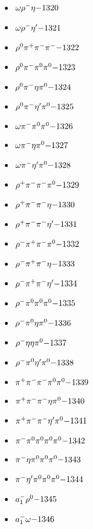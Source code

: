 \begin{multicols}{3}
\begin{itemize}
 \item $ \omega \rho^{-} \eta \hfill{-1320}$
 \item $ \omega \rho^{-} {\eta^{\prime}} \hfill{-1321}$
 \item $ \rho^{0} \pi^{+} \pi^{-} \pi^{-} \hfill{-1322}$
 \item $ \rho^{0} \pi^{-} \pi^{0} \pi^{0} \hfill{-1323}$
 \item $ \rho^{0} \pi^{-} \eta \pi^{0} \hfill{-1324}$
 \item $ \rho^{0} \pi^{-} {\eta^{\prime}} \pi^{0} \hfill{-1325}$
 \item $ \omega \pi^{-} \pi^{0} \pi^{0} \hfill{-1326}$
 \item $ \omega \pi^{-} \eta \pi^{0} \hfill{-1327}$
 \item $ \omega \pi^{-} {\eta^{\prime}} \pi^{0} \hfill{-1328}$
 \item $ \rho^{+} \pi^{-} \pi^{-} \pi^{0} \hfill{-1329}$
 \item $ \rho^{+} \pi^{-} \pi^{-} \eta \hfill{-1330}$
 \item $ \rho^{+} \pi^{-} \pi^{-} {\eta^{\prime}} \hfill{-1331}$
 \item $ \rho^{-} \pi^{+} \pi^{-} \pi^{0} \hfill{-1332}$
 \item $ \rho^{-} \pi^{+} \pi^{-} \eta \hfill{-1333}$
 \item $ \rho^{-} \pi^{+} \pi^{-} {\eta^{\prime}} \hfill{-1334}$
 \item $ \rho^{-} \pi^{0} \pi^{0} \pi^{0} \hfill{-1335}$
 \item $ \rho^{-} \pi^{0} \eta \pi^{0} \hfill{-1336}$
 \item $ \rho^{-} \eta \eta \pi^{0} \hfill{-1337}$
 \item $ \rho^{-} \pi^{0} {\eta^{\prime}} \pi^{0} \hfill{-1338}$
 \item $ \pi^{+} \pi^{-} \pi^{-} \pi^{0} \pi^{0} \hfill{-1339}$
 \item $ \pi^{+} \pi^{-} \pi^{-} \eta \pi^{0} \hfill{-1340}$
 \item $ \pi^{+} \pi^{-} \pi^{-} {\eta^{\prime}} \pi^{0} \hfill{-1341}$
 \item $ \pi^{-} \pi^{0} \pi^{0} \pi^{0} \pi^{0} \hfill{-1342}$
 \item $ \pi^{-} \eta \pi^{0} \pi^{0} \pi^{0} \hfill{-1343}$
 \item $ \pi^{-} {\eta^{\prime}} \pi^{0} \pi^{0} \pi^{0} \hfill{-1344}$
 \item $ a_{1}^{-} \rho^{0} \hfill{-1345}$
 \item $ a_{1}^{-} \omega \hfill{-1346}$

\end{itemize}
\end{multicols}

